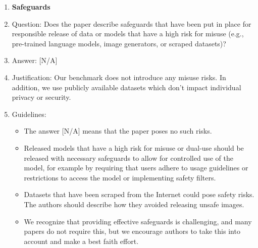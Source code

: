 \documentclass{llmxive}
\providecommand{\answerNA}[1][]{[N/A]#1}
\begin{document}
\begin{enumerate}
\item {\bf Safeguards}
    \item[] Question: Does the paper describe safeguards that have been put in place for responsible release of data or models that have a high risk for misuse (e.g., pre-trained language models, image generators, or scraped datasets)?
    \item[] Answer: \answerNA{}
    \item[] Justification:  Our benchmark does not introduce any misuse risks. In addition, we use publicly available datasets which don’t impact
individual privacy or security.
    \item[] Guidelines:
    \begin{itemize}
        \item The answer \answerNA{} means that the paper poses no such risks.
        \item Released models that have a high risk for misuse or dual-use should be released with necessary safeguards to allow for controlled use of the model, for example by requiring that users adhere to usage guidelines or restrictions to access the model or implementing safety filters. 
        \item Datasets that have been scraped from the Internet could pose safety risks. The authors should describe how they avoided releasing unsafe images.
        \item We recognize that providing effective safeguards is challenging, and many papers do not require this, but we encourage authors to take this into account and make a best faith effort.
    \end{itemize}


\end{enumerate}
\end{document}
